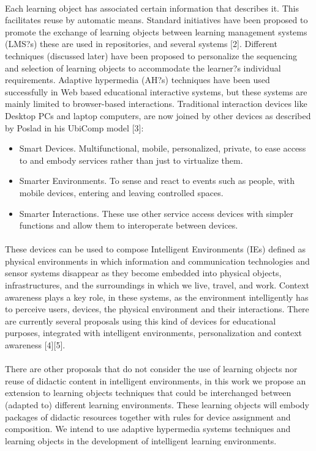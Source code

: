 \documentclass[12pt,letterpaper,oneside] {memoir}
\begin{document}
\paragraph{}
Each learning object has associated certain information that describes it. This facilitates reuse by automatic means. Standard initiatives have been proposed to promote the exchange of learning objects between learning management systems (LMS?s) these are used in repositories, and several systems [2]. Different techniques (discussed later) have been proposed to personalize the sequencing and selection of learning objects to accommodate the learner?s individual requirements. Adaptive hypermedia (AH?s) techniques have been used successfully in Web based educational interactive systems, but these systems are mainly limited to browser-based interactions. Traditional interaction devices like Desktop PCs and laptop computers, are now joined by other devices as described by Poslad in his UbiComp model [3]:
\begin{itemize}
\item Smart Devices. Multifunctional, mobile, personalized, private, to ease access to and embody services rather than just to virtualize them.
\item Smarter Environments. To sense and react to events such as people, with mobile devices, entering and leaving controlled spaces.
\item Smarter Interactions. These use other service access devices with simpler functions and allow them to interoperate between devices.
\end{itemize}
\paragraph{}
These devices can be used to compose Intelligent Environments (IEs) defined as physical environments in which information and communication technologies and sensor systems disappear as they become embedded into physical objects, infrastructures, and the surroundings in which we live, travel, and work. Context awareness plays a key role, in these systems, as the environment intelligently has to perceive users, devices, the physical environment and their interactions. There are currently several proposals using this kind of devices for educational purposes, integrated with intelligent environments, personalization and context awareness [4][5].
\paragraph{} 
There are other proposals that do not consider the use of learning objects nor reuse of didactic content in intelligent environments, in this work we propose an extension to learning objects techniques that could be interchanged between (adapted to) different learning environments. These learning objects will embody packages of didactic resources together with rules for device assignment and composition. We intend to use adaptive hypermedia systems techniques and learning objects in the development of intelligent learning environments. 
\end{document}
